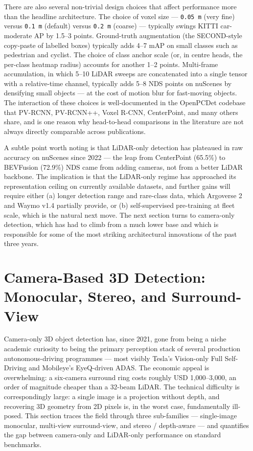 \documentclass{article}
\begin{document}
There are also several non-trivial design choices that affect performance more than the headline architecture. The choice of voxel size --- \texttt{0.05\ m} (very fine) versus \texttt{0.1\ m} (default) versus \texttt{0.2\ m} (coarse) --- typically swings KITTI car-moderate AP by 1.5--3 points. Ground-truth augmentation (the SECOND-style copy-paste of labelled boxes) typically adds 4--7 mAP on small classes such as pedestrian and cyclist. The choice of class anchor scale (or, in centre heads, the per-class heatmap radius) accounts for another 1--2 points. Multi-frame accumulation, in which 5--10 LiDAR sweeps are concatenated into a single tensor with a relative-time channel, typically adds 5--8 NDS points on nuScenes by densifying small objects --- at the cost of motion blur for fast-moving objects. The interaction of these choices is well-documented in the OpenPCDet codebase that PV-RCNN, PV-RCNN++, Voxel R-CNN, CenterPoint, and many others share, and is one reason why head-to-head comparisons in the literature are not always directly comparable across publications.

A subtle point worth noting is that LiDAR-only detection has plateaued in raw accuracy on nuScenes since 2022 --- the leap from CenterPoint (65.5\%) to BEVFusion (72.9\%) NDS came from adding cameras, not from a better LiDAR backbone. The implication is that the LiDAR-only regime has approached its representation ceiling on currently available datasets, and further gains will require either (a) longer detection range and rare-class data, which Argoverse 2 and Waymo v1.4 partially provide, or (b) self-supervised pre-training at fleet scale, which is the natural next move. The next section turns to camera-only detection, which has had to climb from a much lower base and which is responsible for some of the most striking architectural innovations of the past three years.
\section{Camera-Based 3D Detection: Monocular, Stereo, and Surround-View}\label{sec:camera-based-3d-detection-monocular-stereo-and-surround-view}
Camera-only 3D object detection has, since 2021, gone from being a niche academic curiosity to being the primary perception stack of several production autonomous-driving programmes --- most visibly Tesla's Vision-only Full Self-Driving and Mobileye's EyeQ-driven ADAS. The economic appeal is overwhelming: a six-camera surround ring costs roughly USD 1,000--3,000, an order of magnitude cheaper than a 32-beam LiDAR. The technical difficulty is correspondingly large: a single image is a projection without depth, and recovering 3D geometry from 2D pixels is, in the worst case, fundamentally ill-posed. This section traces the field through three sub-families --- single-image monocular, multi-view surround-view, and stereo / depth-aware --- and quantifies the gap between camera-only and LiDAR-only performance on standard benchmarks.
\end{document}
